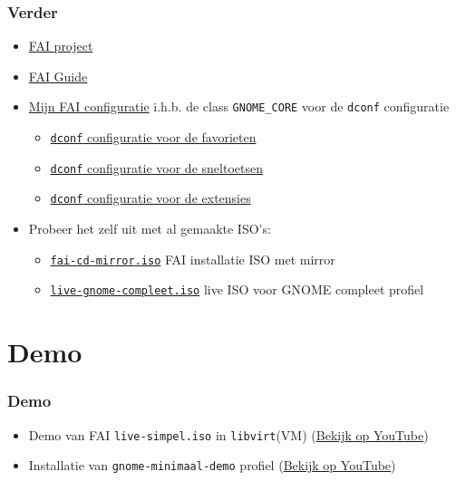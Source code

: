 \documentclass{beamer}
\begin{document}
\begin{frame}
\frametitle{Verder}
\begin{itemize}
  \item \href{https://fai-project.org/}{FAI project}
  \item \href{https://fai-project.org/fai-guide/}{FAI Guide}
  \item \href{https://github.com/slspeek/fai/}{Mijn FAI configuratie} i.h.b. 
  de class \texttt{GNOME\_CORE} voor de \texttt{dconf} configuratie
  \begin{itemize}
    \item \href{https://github.com/slspeek/fai/blob/main/files/etc/dconf/db/local.d/00-favorite-apps/DEVELOPER}{\texttt{dconf} configuratie voor de favorieten}
    \item \href{https://github.com/slspeek/fai/blob/main/files/etc/dconf/db/local.d/10-shortcuts/GNOME_CORE}{\texttt{dconf} configuratie voor de sneltoetsen}
    \item \href{https://github.com/slspeek/fai/blob/main/files/etc/dconf/db/local.d/40-gnome-extensions/GNOME_EXTENSIONS}{\texttt{dconf} configuratie voor de extensies}
  \end{itemize}
  \item Probeer het zelf uit met al gemaakte ISO's:
  \begin{itemize}
    \item \href{https://mega.nz/file/TE8XWAzA\#gtv1uKtn6BQc_yGHdHBH0EyYe90PIDSq49tcnSwj1iI}{\texttt{fai-cd-mirror.iso}} FAI installatie ISO met mirror
    \item \href{https://mega.nz/file/OYVCHSQC\#-JoJz0aZdVl_ArLC3NAudJnqwwC8qzex0l865wZ6Cg4}{\texttt{live-gnome-compleet.iso}} live ISO voor GNOME compleet profiel
  \end{itemize}
\end{itemize}
\end{frame}

\section{Demo}
\begin{frame}
\frametitle{Demo}
\begin{itemize}
  \item Demo van FAI \texttt{live-simpel.iso} in \texttt{libvirt}(VM) (\href{https://youtu.be/4j1Wtoy2kK8}{Bekijk op YouTube})
  \item Installatie van \texttt{gnome-minimaal-demo} profiel (\href{https://youtu.be/CE_PjYTGtjc}{Bekijk op YouTube})
\end{itemize}
\end{frame}
\end{document}
